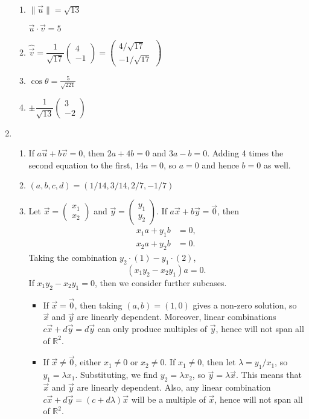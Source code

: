 \begin{enumerate}
\begin{enumerate}
\item $\|\vec{u}\| = \sqrt{13}$\par
$\vec{u}\cdot\vec{v} = 5$
\item $\hat{\vec{v}} = \dfrac{1}{\sqrt{17}}\begin{pmatrix} 4 \\ -1 \end{pmatrix} = \begin{pmatrix} 4/\sqrt{17} \\ -1/\sqrt{17} \end{pmatrix}$
\item $\cos\theta = \frac{5}{\sqrt{221}}$
\item $\pm\dfrac{1}{\sqrt{13}}\begin{pmatrix} 3 \\ -2 \end{pmatrix}$
\end{enumerate}
\item \begin{enumerate}
\item If $a\vec{u} + b\vec{v} = 0$, then $2a + 4b = 0$ and $3a - b = 0$. Adding 4 times the second equation to the first, $14a = 0$, so $a = 0$ and hence $b = 0$ as well.
\item $(a,b,c,d) = (1/14, 3/14, 2/7, -1/7)$
\item Let $\vec{x} = \begin{pmatrix} x_1 \\ x_2 \end{pmatrix}$ and $\vec{y} = \begin{pmatrix} y_1 \\ y_2 \end{pmatrix}$. If $a\vec{x} + b\vec{y} = \vec{0}$, then
\begin{align}
x_1a + y_1b &= 0, \\
x_2a + y_2b &= 0.
\end{align}
Taking the combination $y_2\cdot (1) - y_1\cdot (2)$,
\begin{equation*}
(x_1y_2 - x_2y_1)a = 0.
\end{equation*}
If $x_1y_2 - x_2y_1 = 0$, then we consider further subcases.
\begin{itemize}
\item If $\vec{x} = \vec{0}$, then taking $(a,b) = (1,0)$ gives a non-zero solution, so $\vec{x}$ and $\vec{y}$ are linearly dependent. Moreover, linear combinations $c\vec{x} + d\vec{y} = d\vec{y}$ can only produce multiples of $\vec{y}$, hence will not span all of $\mathbb{R}^2$.
\item If $\vec{x}\neq\vec{0}$, either $x_1\neq 0$ or $x_2\neq 0$. If $x_1\neq 0$, then let $\lambda = y_1/x_1$, so $y_1 = \lambda x_1$. Substituting, we find $y_2 = \lambda x_2$, so $\vec{y} = \lambda\vec{x}$. This means that $\vec{x}$ and $\vec{y}$ are linearly dependent. Also, any linear combination $c\vec{x} + d\vec{y} = (c + d\lambda)\vec{x}$ will be a multiple of $\vec{x}$, hence will not span all of $\mathbb{R}^2$.

\end{itemize}
\end{enumerate}
\end{enumerate}
